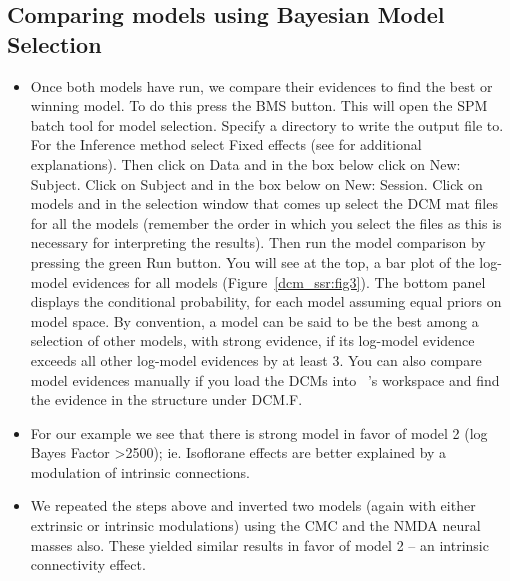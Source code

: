 \subsection{Comparing models using Bayesian Model Selection}

\begin{itemize}
\item Once both models have run, we compare their evidences to find the best or winning model. 
To do this press the BMS button. This will open the SPM batch tool for model selection. Specify a directory to write the output file to. For the Inference method select Fixed effects (see  \cite{klaas_bms} for additional explanations). Then click on Data and in the box below click on New: Subject. Click on Subject and in the box below on New: Session. Click on models and in the selection window that comes up select the DCM mat files for all the models (remember the order in which you select the files as this is necessary for interpreting the results). Then run the model comparison by pressing the green Run button. You will see at the top, a bar plot of the log-model evidences for all models (Figure~\ref{dcm_ssr:fig3}). The bottom panel displays the conditional probability, for each model assuming equal priors on model space. By convention, a model can be said to be the best among a selection of other models, with strong evidence, if its log-model evidence exceeds all other log-model evidences by at least 3. You can also compare model evidences manually if you load the DCMs into \matlab\ ’s workspace and find the evidence in the structure under DCM.F.
\item For our example we see that there is strong model in favor of model 2 (log Bayes Factor >2500); ie. Isoflorane effects are better explained by a modulation of intrinsic connections.
\item We repeated the steps above and inverted two models (again with either extrinsic or intrinsic modulations) using the CMC and the NMDA neural masses also. These yielded similar results in favor of model 2 – an intrinsic connectivity effect. 
\end{itemize}

